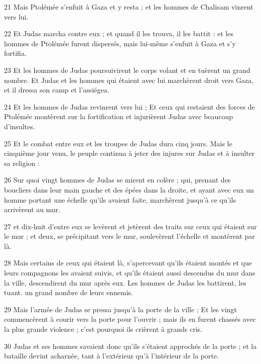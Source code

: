 \par 21 Mais Ptolémée s'enfuit à Gaza et y resta ; et les hommes de Chalisam vinrent vers lui.

\par 22 Et Judas marcha contre eux ; et quand il les trouva, il les battit : et les hommes de Ptolémée furent dispersés, mais lui-même s'enfuit à Gaza et s'y fortifia.

\par 23 Et les hommes de Judas poursuivirent le corps volant et en tuèrent un grand nombre. Et Judas et les hommes qui étaient avec lui marchèrent droit vers Gaza, et il dressa son camp et l'assiégea.

\par 24 Et les hommes de Judas revinrent vers lui ; Et ceux qui restaient des forces de Ptolémée montèrent sur la fortification et injurièrent Judas avec beaucoup d'insultes.

\par 25 Et le combat entre eux et les troupes de Judas dura cinq jours. Mais le cinquième jour venu, le peuple continua à jeter des injures sur Judas et à insulter sa religion :

\par 26 Sur quoi vingt hommes de Judas se mirent en colère ; qui, prenant des boucliers dans leur main gauche et des épées dans la droite, et ayant avec eux un homme portant une échelle qu'ils avaient faite, marchèrent jusqu'à ce qu'ils arrivèrent au mur.

\par 27 et dix-huit d'entre eux se levèrent et jetèrent des traits sur ceux qui étaient sur le mur ; et deux, se précipitant vers le mur, soulevèrent l'échelle et montèrent par là.

\par 28 Mais certains de ceux qui étaient là, s'apercevant qu'ils étaient montés et que leurs compagnons les avaient suivis, et qu'ils étaient aussi descendus du mur dans la ville, descendirent du mur après eux. Les hommes de Judas les battirent, les tuant. un grand nombre de leurs ennemis.

\par 29 Mais l'armée de Judas se pressa jusqu'à la porte de la ville ; Et les vingt commencèrent à courir vers la porte pour l'ouvrir ; mais ils en furent chassés avec la plus grande violence ; c'est pourquoi ils crièrent à grands cris.

\par 30 Judas et ses hommes savaient donc qu'ils s'étaient approchés de la porte ; et la bataille devint acharnée, tant à l'extérieur qu'à l'intérieur de la porte.

